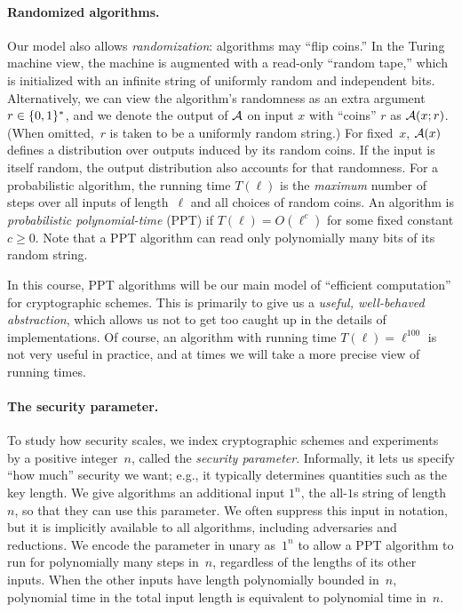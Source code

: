 \documentclass[11pt]{article}
\begin{document}
\paragraph{Randomized algorithms.}

Our model also allows \emph{randomization}: algorithms may ``flip coins.''
In the Turing machine view, the machine is augmented with a read-only ``random tape,'' which is initialized with an infinite string of uniformly random and independent bits.
Alternatively, we can view the algorithm's randomness as an extra argument $r \in \{0,1\}^{*}$, and we denote the output of $\mathcal{A}$ on input $x$ with ``coins'' $r$ as $\mathcal{A}(x; r)$.
(When omitted,~$r$ is taken to be a uniformly random string.)
For fixed~$x$, $\mathcal{A}(x)$ defines a distribution over outputs induced by its random coins.
If the input is itself random, the output distribution also accounts for that randomness.
For a probabilistic algorithm, the running time $T(\ell)$ is the \emph{maximum} number of steps over all inputs of length~$\ell$ and all choices of random coins.
An algorithm is \emph{probabilistic polynomial-time} (PPT) if $T(\ell)=O(\ell^{c})$ for some fixed constant $c\geq0$.
Note that a PPT algorithm can read only polynomially many bits of its random string.

In this course, PPT algorithms will be our main model of ``efficient computation'' for cryptographic schemes.
This is primarily to give us a \emph{useful, well-behaved abstraction}, which allows us not to get too caught up in the details of implementations.
Of course, an algorithm with running time $T(\ell)=\ell^{100}$ is not very useful in practice, and at times we will take a more precise view of running times.

\paragraph{The security parameter.}

To study how security scales, we index cryptographic schemes and experiments by a positive integer~$n$, called the \emph{security parameter}.
Informally, it lets us specify ``how much'' security we want; e.g., it typically determines quantities such as the key length.
We give algorithms an additional input $1^n$, the all-$1$s string of length~$n$, so that they can use this parameter.
We often suppress this input in notation, but it is implicitly available to all algorithms, including adversaries and reductions.
We encode the parameter in unary as~$1^n$ to allow a PPT algorithm to run for polynomially many steps in~$n$, regardless of the lengths of its other inputs.
When the other inputs have length polynomially bounded in~$n$, polynomial time in the total input length is equivalent to polynomial time in~$n$.
\end{document}
